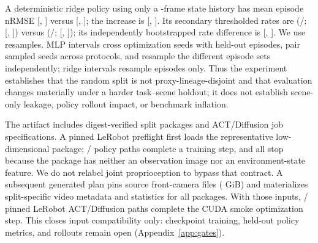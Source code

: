 A deterministic ridge policy using only a \ExpTemporalHistoryFrames-frame state history has mean
episode nRMSE \ExpTemporalRandomNrmse{}
[\ExpTemporalRandomNrmseCiLow, \ExpTemporalRandomNrmseCiHigh] versus
\ExpTemporalHeldoutNrmse{} [\ExpTemporalHeldoutNrmseCiLow,
\ExpTemporalHeldoutNrmseCiHigh]; the increase is \ExpTemporalNrmseDifference{}
[\ExpTemporalNrmseDifferenceCiLow, \ExpTemporalNrmseDifferenceCiHigh]. Its secondary thresholded
rates are \ExpTemporalRandomSuccessRate{}
(\ExpTemporalRandomSuccessCount/\ExpSceneRandomTestEpisodes{};
[\ExpTemporalRandomSuccessCiLow, \ExpTemporalRandomSuccessCiHigh]) versus
\ExpTemporalHeldoutSuccessRate{}
(\ExpTemporalHeldoutSuccessCount/\ExpSceneHeldoutTestEpisodes{};
[\ExpTemporalHeldoutSuccessCiLow, \ExpTemporalHeldoutSuccessCiHigh]); its independently bootstrapped
rate difference is \ExpTemporalSuccessDifference{}
[\ExpTemporalSuccessDifferenceCiLow, \ExpTemporalSuccessDifferenceCiHigh]. We use
\ExpBootstrapResamples{} resamples. MLP intervals cross optimization seeds with held-out episodes,
pair sampled seeds across protocols, and resample the different episode sets independently; ridge
intervals resample episodes only. Thus the experiment establishes that the random split is not
proxy-lineage-disjoint and that evaluation changes materially under a harder task--scene holdout;
it does not establish scene-only leakage, policy rollout impact, or benchmark inflation.

The artifact includes digest-verified split packages and ACT/Diffusion job specifications. A pinned
LeRobot \ExpPolicyCompatibilityLeRobotVersion{} preflight first loads the representative
low-dimensional package; \ExpPolicyCompatibilityTrainingStepCount{}/\ExpPolicyCompatibilityProbeCount{}
policy paths complete a training step, and all \ExpPolicyCompatibilityExpectedBlockerCount{} stop
because the package has neither an observation image nor an environment-state feature. We do not
relabel joint proprioception to bypass that contract. A subsequent generated plan pins
\ExpPolicyVisionAssetCount{} source front-camera files (\ExpPolicyVisionAssetGiB{} GiB) and
materializes split-specific video metadata and statistics for all \ExpPolicyVisionPackageCount{}
packages. With those inputs, \ExpPolicyVisionTrainingStepCount{}/\ExpPolicyVisionProbeCount{} pinned
LeRobot \ExpPolicyVisionLeRobotVersion{} ACT/Diffusion paths complete the CUDA smoke optimization step.
This closes input compatibility only: checkpoint training, held-out policy metrics, and rollouts
remain open (Appendix~\ref{app:gates}).


